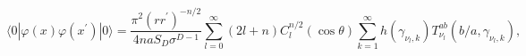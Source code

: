 \begin{equation}
\langle 0|\varphi (x)\varphi (x^{\prime })|0\rangle =\frac{\pi
^{2}(rr^{\prime })^{-n/2}}{4naS_{D}\sigma ^{D-1}}\sum_{l=0}^{\infty
}(2l+n)C_{l}^{n/2}(\cos \theta )\sum_{k=1}^{\infty }h(\gamma _{\nu
_{l},k})T_{\nu _{l}}^{ab}(b/a,\gamma _{\nu _{l},k}),  \label{fieldmodesum1ab}
\end{equation}

